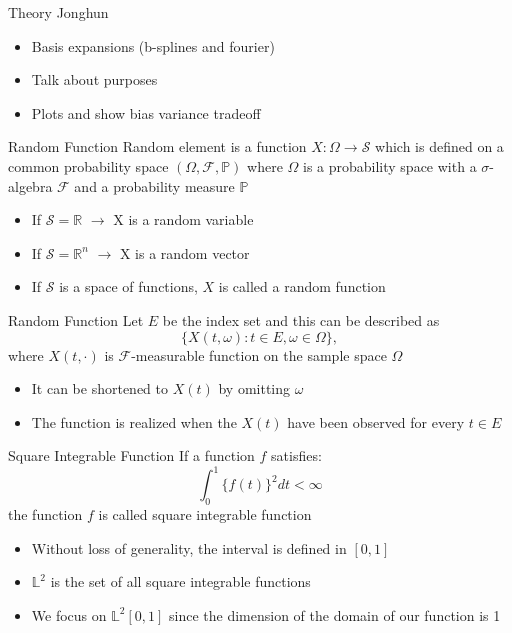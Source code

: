 \documentclass{beamer}
\begin{document}
	\begin{frame}{Theory}
		Jonghun
		\begin{itemize}
			\item Basis expansions (b-splines and fourier)
			\item Talk about purposes
			\item Plots and show bias variance tradeoff
		\end{itemize}
	\end{frame}

	\begin{frame}{Random Function}
		Random element is a function $X : \Omega \rightarrow \mathcal{S}$ which is defined on a common probability space $(\Omega, \mathcal{F}, \mathbb{P})$ where $\Omega$ is a probability space with a $\sigma$-algebra $\mathcal{F}$ and a probability measure $\mathbb{{P}}$
		\begin{itemize}
			\item If $\mathcal{S} = \mathbb{R}$ $\rightarrow$ X is a random variable
			\item If $\mathcal{S} = \mathbb{R}^{n}$ $\rightarrow$ X is a random vector
			\item If $\mathcal{S}$ is a space of functions, $X$ is called a random function
		\end{itemize}
	\end{frame}

	\begin{frame}{Random Function}
		Let $E$ be the index set and this can be described as
		$${\{X(t,\omega) : t \in E, \omega \in \Omega\},}$$
		where $X(t, \cdot)$ is $\mathcal{F}$-measurable function on the sample space $\Omega$\\
		\begin{itemize}
			\item It can be shortened to $X(t)$ by omitting $\omega$
			\item The function is realized when the $X(t)$ have been observed for every $t \in E$
		\end{itemize}
	\end{frame}
	
	\begin{frame}{Square Integrable Function}
		If a function $f$ satisfies:
		$$\int_{0}^{1} \{f(t)\}^{2}dt < \infty$$
		the function $f$ is called square integrable function
		\begin{itemize}
			\item Without loss of generality, the interval is defined in $[0,1] $
			\item $\mathbb{L}^{2}$ is the set of all square integrable functions
			\item We focus on $\mathbb{L}^{2} [0,1]$ since the dimension of the domain of our function is 1
		\end{itemize}
	\end{frame}
	
\end{document}
